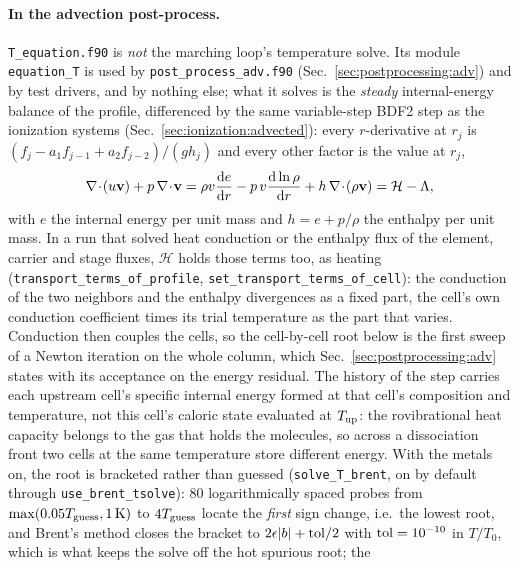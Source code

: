 \paragraph{In the advection post-process.} \texttt{T\_equation.f90} is
\emph{not} the marching loop's temperature solve. Its module
\texttt{equation\_T} is used by \texttt{post\_process\_adv.f90}
(Sec.~\ref{sec:postprocessing:adv}) and by test drivers, and by nothing else;
what it solves is the \emph{steady} internal-energy balance of the profile,
differenced by the same variable-step BDF2 step as the ionization systems
(Sec.~\ref{sec:ionization:advected}): every $r$-derivative at $r_j$ is
$(f_j - a_1 f_{j-1} + a_2 f_{j-2})/(g h_j)$ and every other factor is the value
at $r_j$,
\begin{equation}
\nabla\!\cdot\!(u\mathbf{v}) + p\,\nabla\!\cdot\!\mathbf{v}
 = \rho v\frac{{\rm d}e}{{\rm d}r}
 - p\,v\frac{{\rm d}\ln\rho}{{\rm d}r}
 + h\,\nabla\!\cdot\!(\rho\mathbf{v})
 = \mathcal{H}-\Lambda,
\label{eq:th:teq}
\end{equation}
with $e$ the internal energy per unit mass and $h = e+p/\rho$ the enthalpy
per unit mass. In a run that solved heat conduction or the enthalpy flux of
the element, carrier and stage fluxes, $\mathcal{H}$ holds those terms too,
as heating (\texttt{transport\_terms\_of\_profile},
\texttt{set\_transport\_terms\_of\_cell}): the conduction of the two
neighbors and the enthalpy divergences as a fixed part, the cell's own
conduction coefficient times its trial temperature as the part that varies.
Conduction then couples the cells, so the cell-by-cell root below is the
first sweep of a Newton iteration on the whole column, which
Sec.~\ref{sec:postprocessing:adv} states with its acceptance on the energy
residual. The history of the step carries each upstream cell's specific internal
energy formed at that cell's composition and temperature, not this cell's
caloric state evaluated at $T_{\rm up}$: the rovibrational heat capacity
belongs to the gas that holds the molecules, so across a dissociation front
two cells at the same temperature store different energy. With the metals
on, the root is bracketed rather than guessed (\texttt{solve\_T\_brent}, on
by default through \texttt{use\_brent\_tsolve}): 80 logarithmically spaced probes from
$\max(0.05T_{\rm guess},1\,{\rm K})$ to $4T_{\rm guess}$ locate the
\emph{first} sign change, i.e.\ the lowest root, and Brent's method closes
the bracket to $2\epsilon|b|+{\rm tol}/2$ with ${\rm tol}=10^{-10}$ in
$T/T_0$, which is what keeps the solve off the hot spurious root; the
